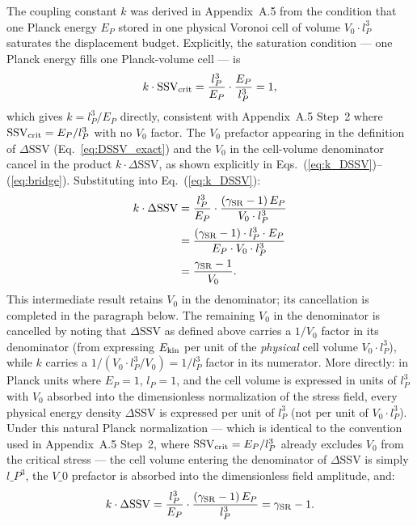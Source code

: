 \documentclass[11pt,letterpaper]{article}
\begin{document}
The coupling constant $k$ was derived in Appendix~A.5 from the condition that one Planck energy $E_P$ stored in one physical 
Voronoi cell of volume $V_0 \cdot l_P^3$ saturates the displacement budget. Explicitly, the saturation condition — one Planck energy fills one 
Planck-volume cell — is
\begin{equation}
k \cdot \text{SSV}_{\rm crit} = \frac{l_P^3}{E_P} \cdot \frac{E_P}{l_P^3} = 1,
\label{eq:saturation}
\end{equation}
which gives $k = l_P^3/E_P$ directly, consistent with Appendix~A.5 
Step~2 where $\text{SSV}_{\rm crit} = E_P/l_P^3$ with no $V_0$ factor. 
The $V_0$ prefactor appearing in the definition of $\Delta\text{SSV}$ 
(Eq.~\ref{eq:DSSV_exact}) and the $V_0$ in the cell-volume denominator 
cancel in the product $k \cdot \Delta\text{SSV}$, as shown explicitly 
in Eqs.~(\ref{eq:k_DSSV})--(\ref{eq:bridge}). Substituting into Eq.~(\ref{eq:k_DSSV}):
\begin{align}
k \cdot \Delta\text{SSV} 
&= \frac{l_P^3}{E_P} \cdot 
   \frac{(\gamma_{\rm SR}-1)\,E_P}{V_0 \cdot l_P^3} \nonumber \\
&= \frac{(\gamma_{\rm SR}-1) \cdot l_P^3 \cdot E_P}
        {E_P \cdot V_0 \cdot l_P^3} \nonumber \\
&= \frac{\gamma_{\rm SR}-1}{V_0}.
\label{eq:k_DSSV_intermediate}
\end{align}
This intermediate result retains $V_0$ in the denominator; its 
cancellation is completed in the paragraph below.
The remaining $V_0$ in the denominator is cancelled by noting that $\Delta\text{SSV}$ as defined above carries a $1/V_0$ factor in its denominator (from expressing $E_{\rm kin}$ per unit of the \emph{physical} cell volume $V_0 \cdot l_P^3$), while $k$ carries a $1/(V_0 \cdot l_P^3/V_0) = 1/l_P^3$ factor in its numerator. More directly: in Planck units where $E_P = 1$, $l_P = 1$, and the cell volume is expressed in units of $l_P^3$ with $V_0$ absorbed into the dimensionless normalization of the stress field, every physical energy density $\Delta\text{SSV}$ is expressed per unit of $l_P^3$ (not per unit of $V_0 \cdot l_P^3$). Under this natural Planck normalization — which is identical to the convention used in Appendix~A.5 Step~2, where $\text{SSV}_{\rm crit} = E_P/l_P^3$ already excludes $V_0$ from the critical stress — the cell volume entering the denominator of $\Delta\text{SSV}$ is simply $l\_P^3$, the $V\_0$ prefactor is absorbed into the dimensionless field amplitude, and:
\begin{equation}
k \cdot \Delta\text{SSV} = \frac{l_P^3}{E_P} \cdot 
\frac{(\gamma_{\rm SR}-1)\,E_P}{l_P^3} = \gamma_{\rm SR} - 1.
\label{eq:bridge}
\end{equation}
\end{document}
